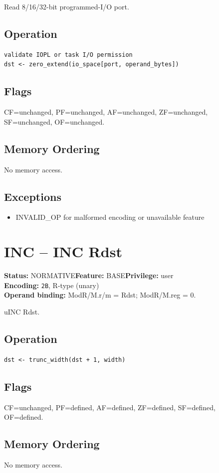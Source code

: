 \documentclass[10pt]{article}
\begin{document}
Read 8/16/32-bit programmed-I/O port.

\subsection*{Operation}
\begin{lstlisting}
validate IOPL or task I/O permission
dst <- zero_extend(io_space[port, operand_bytes])
\end{lstlisting}
\subsection*{Flags}
CF=unchanged, PF=unchanged, AF=unchanged, ZF=unchanged, SF=unchanged, OF=unchanged.
\subsection*{Memory Ordering}
No memory access.
\subsection*{Exceptions}
\begin{itemize}
\item INVALID\_OP for malformed encoding or unavailable feature
\end{itemize}
\clearpage

\section{INC -- INC Rdst}
\textbf{Status:} NORMATIVE\quad \textbf{Feature:} BASE\quad \textbf{Privilege:} user\\
\textbf{Encoding:} \texttt{2B}, R-type (unary)\\
\textbf{Operand binding:} ModR/M.r/m = Rdst; ModR/M.reg = 0.

uINC Rdst.

\subsection*{Operation}
\begin{lstlisting}
dst <- trunc_width(dst + 1, width)
\end{lstlisting}
\subsection*{Flags}
CF=unchanged, PF=defined, AF=defined, ZF=defined, SF=defined, OF=defined.
\subsection*{Memory Ordering}
No memory access.
\end{document}
